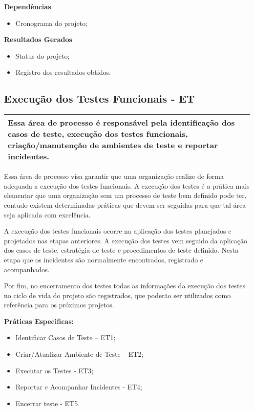 \textbf{Dependências}
\begin{itemize}
    \item Cronograma do projeto;
\end{itemize}

\textbf{Resultados Gerados}
\begin{itemize}
    \item  Status do projeto;
    \item  Registro dos resultados obtidos.
\end{itemize}

\subsection{Execução dos Testes Funcionais - ET}
\label{sec:et0}

\begin{table}[!ht]
\centering
\begin{tabular}{|p{130mm}|}
\hline
Essa área de processo é responsável pela identificação dos casos de teste, execução dos testes funcionais, criação/manutenção de ambientes de teste e reportar incidentes. \\ 
\hline
\end{tabular}
\end{table}

Essa área de processo visa garantir que uma organização realize de forma adequada a execução dos testes funcionais. A execução dos testes é a prática mais elementar que uma organização sem um processo de teste bem definido pode ter, contudo existem determinadas práticas que devem ser seguidas para que tal área seja aplicada com excelência.

A execução dos testes funcionais ocorre na aplicação dos testes planejados e projetados nas etapas anteriores. A execução dos testes vem seguido da aplicação dos casos de teste, estratégia de teste e procedimentos de teste definido. Nesta etapa que os incidentes são normalmente encontrados, registrado e acompanhados.

Por fim, no encerramento dos testes todas as informações da execução dos testes no ciclo de vida do projeto são registrados, que poderão ser utilizados como referência para os próximos projetos.

\textbf{Práticas Especificas:}
\begin{itemize}
    \item Identificar Casos de Teste – ET1;
    \item Criar/Atualizar Ambiente de Teste – ET2;
    \item Executar os Testes - ET3;
    \item Reportar e Acompanhar Incidentes - ET4;
    \item Encerrar teste - ET5.
\end{itemize}

